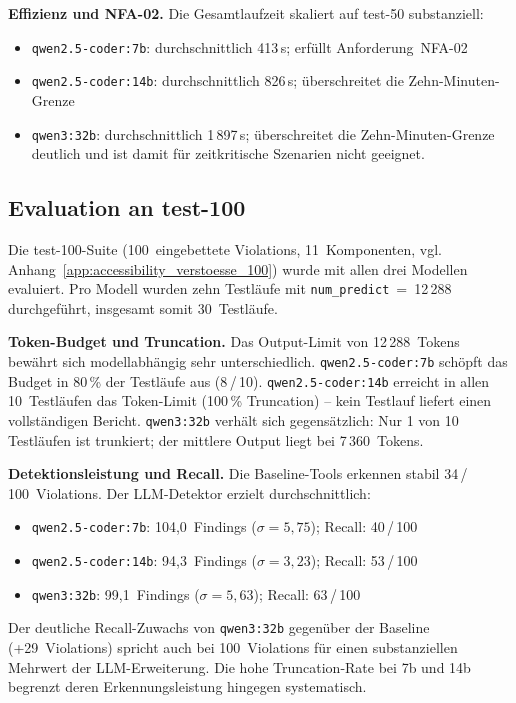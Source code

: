 \textbf{Effizienz und \ac{NFA}-02.}
Die Gesamtlaufzeit skaliert auf test-50 substanziell:
\begin{itemize}
  \item \texttt{qwen2.5-coder:7b}: durchschnittlich 413\,s; erfüllt Anforderung~\ac{NFA}-02
  \item \texttt{qwen2.5-coder:14b}: durchschnittlich 826\,s; überschreitet die Zehn-Minuten-Grenze
  \item \texttt{qwen3:32b}: durchschnittlich 1\,897\,s; überschreitet die Zehn-Minuten-Grenze deutlich und ist damit für zeitkritische Szenarien nicht geeignet.
\end{itemize}

\subsection{Evaluation an test-100}
\label{sec:eval_suiten_100}

Die test-100-Suite (100~eingebettete Violations, 11~Komponenten, vgl. Anhang~\ref{app:accessibility_verstoesse_100}) wurde mit allen drei Modellen evaluiert. Pro Modell wurden zehn Testläufe mit \texttt{num\_predict}~=~12\,288 durchgeführt, insgesamt somit 30~Testläufe.

\textbf{Token-Budget und Truncation.}
Das Output-Limit von 12\,288~Tokens bewährt sich modellabhängig sehr unterschiedlich. \texttt{qwen2.5-coder:7b} schöpft das Budget in 80\,\% der Testläufe aus (8\,/\,10). \texttt{qwen2.5-coder:14b} erreicht in allen 10~Testläufen das Token-Limit (100\,\% Truncation) -- kein Testlauf liefert einen vollständigen Bericht. \texttt{qwen3:32b} verhält sich gegensätzlich: Nur 1 von 10 Testläufen ist trunkiert; der mittlere Output liegt bei 7\,360~Tokens.

\textbf{Detektionsleistung und Recall.}
Die Baseline-Tools erkennen stabil 34\,/\,100~Violations. Der \ac{LLM}-Detektor erzielt durchschnittlich:
\begin{itemize}
  \item \texttt{qwen2.5-coder:7b}: 104{,}0~Findings ($\sigma = 5{,}75$); Recall: 40\,/\,100
  \item \texttt{qwen2.5-coder:14b}: 94{,}3~Findings ($\sigma = 3{,}23$); Recall: 53\,/\,100
  \item \texttt{qwen3:32b}: 99{,}1~Findings ($\sigma = 5{,}63$); Recall: 63\,/\,100
\end{itemize}
Der deutliche Recall-Zuwachs von \texttt{qwen3:32b} gegenüber der Baseline (+29~Violations) spricht auch bei 100~Violations für einen substanziellen Mehrwert der \ac{LLM}-Erweiterung. Die hohe Truncation-Rate bei 7b und 14b begrenzt deren Erkennungsleistung hingegen systematisch.

